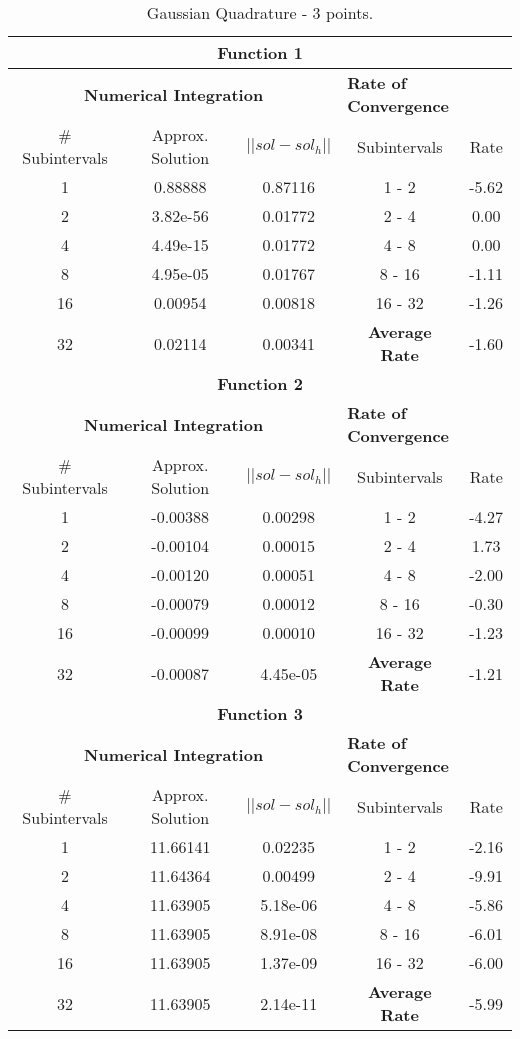 \begin{table}[H]
    \centering
    \caption{Gaussian Quadrature - 3 points.}
    \begin{tabular}{ccccc}
    \hline
    \multicolumn{5}{c}{\textbf{Function 1}} \\
    \hline
    \multicolumn{3}{c}{\textbf{Numerical Integration}} & \multicolumn{2}{l}{\textbf{Rate of Convergence}} \\\hline
    \# Subintervals & Approx. Solution & $|| sol - sol_h ||$ & Subintervals & Rate \\\hline
    1 & 0.88888 & 0.87116 & 1 - 2 &  -5.62\\
    2 & 3.82e-56 & 0.01772 & 2 - 4 &  0.00\\
    4 & 4.49e-15 & 0.01772 & 4 - 8 &  0.00\\
    8 & 4.95e-05 & 0.01767 & 8 - 16 &  -1.11\\
    16 & 0.00954 & 0.00818 & 16 - 32 &  -1.26\\
    32 & 0.02114 & 0.00341 & \textbf{Average Rate} & -1.60\\ \hline
    \multicolumn{5}{c}{\textbf{Function 2}} \\
    \hline
    \multicolumn{3}{c}{\textbf{Numerical Integration}} & \multicolumn{2}{l}{\textbf{Rate of Convergence}} \\\hline
    \# Subintervals & Approx. Solution & $|| sol - sol_h ||$ & Subintervals & Rate \\\hline
    1 & -0.00388 & 0.00298 & 1 - 2 &  -4.27\\
    2 & -0.00104 & 0.00015 & 2 - 4 &  1.73\\
    4 & -0.00120 & 0.00051 & 4 - 8 &  -2.00\\
    8 & -0.00079 & 0.00012 & 8 - 16 &  -0.30\\
    16 & -0.00099 & 0.00010 & 16 - 32 &  -1.23\\
    32 & -0.00087 & 4.45e-05 & \textbf{Average Rate} & -1.21\\ \hline
    \multicolumn{5}{c}{\textbf{Function 3}} \\
    \hline
    \multicolumn{3}{c}{\textbf{Numerical Integration}} & \multicolumn{2}{l}{\textbf{Rate of Convergence}} \\\hline
    \# Subintervals & Approx. Solution & $|| sol - sol_h ||$ & Subintervals & Rate \\\hline
    1 & 11.66141&  0.02235 & 1 - 2 &  -2.16\\
    2 & 11.64364 & 0.00499 & 2 - 4 &  -9.91\\
    4 & 11.63905 & 5.18e-06 & 4 - 8 &  -5.86\\
    8 & 11.63905 & 8.91e-08 & 8 - 16 &  -6.01\\
    16 & 11.63905 & 1.37e-09 & 16 - 32 &  -6.00\\
    32 & 11.63905 & 2.14e-11 & \textbf{Average Rate} & -5.99\\ \hline
\end{tabular}
\end{table}

